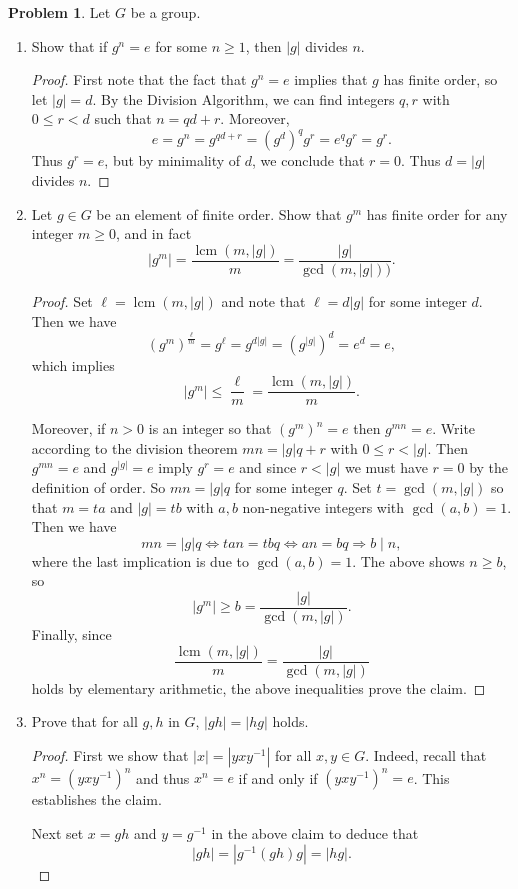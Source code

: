 \documentclass[11pt]{article}
\DeclareMathOperator{\lcm}{lcm}
\theoremstyle{definition}
\newtheorem{problem}{Problem}
\begin{document}
\begin{problem} Let $G$ be a group.
 \begin{enumerate}[(3.1)]
 \item Show that if $g^n=e$ for some $n \geq 1$, then $|g|$ divides $n$.
 

 \begin{proof}
	First note that the fact that $g^n = e$ implies that $g$ has finite order, so let $|g| = d$. By the Division Algorithm, we can find integers $q, r$ with $0 \leqslant r < d$ such that $n = qd+r$. Moreover,
	$$e = g^n = g^{qd+r} = (g^d)^qg^r = e^qg^r = g^r.$$
Thus $g^r = e$, but by minimality of $d$, we conclude that $r=0$. Thus $d = |g|$ divides $n$.
\end{proof}


\item Let $g \in G$ be an element of finite order. Show that $g^m$ has finite order for any integer $m \geq 0$, and in fact
\[
|g^m| = \frac{\lcm(m,|g|)}{m} = \frac{|g|}{\gcd(m, |g|))}.
\]

\begin{proof}
Set $\ell=\lcm(m,|g|)$ and note that $\ell=d|g|$ for some integer $d$. Then we have
\[
(g^m)^{\frac{\ell}{m}}=g^{\ell}=g^{d|g|}=\left(g^{|g|}\right)^{d}=e^{d}=e,
\]
which implies 
\[
|g^m| \leq \frac{\ell}{m}=\frac{\lcm(m,|g|)}{m}.
\]

Moreover, if $n>0$ is an integer so that $(g^m)^n=e$ then $g^{mn}=e$. Write according to the division theorem $mn=|g|q+r$ with $0\leq r<|g|$. Then $g^{mn}=e$ and $g^{|g|}=e$ imply $g^{r}=e$ and since $r<|g|$ we must have $r=0$ by the definition of order. So $mn= |g|q$ for some integer $q$.  Set $t=\gcd(m, |g|)$ so that $m=ta$ and $|g|=tb$ with $a,b$ non-negative integers with $\gcd(a,b)=1$. Then we have
\[
mn= |g|q \iff tan= tbq \iff an=bq \Rightarrow b\mid n,
\]
where the last implication is due to $\gcd(a,b)=1$. The above shows $n\geq b$, so
\[
|g^m| \geq b= \frac{|g|}{\gcd(m, |g|)}.
\]
Finally, since  \[\frac{\lcm(m,|g|)}{m} = \frac{|g|}{\gcd(m, |g|)}\] holds by elementary arithmetic, the above inequalities prove the claim.
\end{proof}


\item Prove that for all $g, h$ in  $G$, $|gh| = |hg|$ holds.

\begin{proof}
First we show that $|x|=|yxy^{-1}|$ for all $x,y\in G$. Indeed, recall that $x^n=(yxy^{-1})^n$ and thus $x^n=e$ if and only if $(yxy^{-1})^n=e$. This establishes the claim.

Next set $x=gh$ and $y=g^{-1}$ in the above claim to deduce that 
\[
|gh|=|g^{-1}(gh)g|=|hg|.
\]
\end{proof}
\end{enumerate}
\end{problem}
\end{document}
